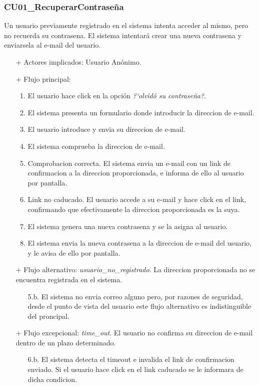 \documentclass[a4paper,11pt]{report}
\begin{document}
    \subsubsection{CU01\_RecuperarContrase\~na}
    Un usuario previamente registrado en el sistema intenta acceder al mismo, pero no recuerda su contrasena. El sistema intentar\'a crear una nueva contrasena y enviarsela al e-mail del usuario.
    \begin{itemize}
        \item[+] Actores implicados: Usuario An\'onimo.
        \item[+] Flujo principal:
        \begin{enumerate}
            \item El usuario hace click en la opci\'on \emph{?`olvid\'o su contrase\~na?}.
            \item El sistema presenta un formulario donde introducir la direccion de e-mail.
            \item El usuario introduce y envia su direccion de e-mail.
            \item El sistema comprueba la direccion de e-mail.
            \item Comprobacion correcta. El sistema envia un e-mail con un link de confirmacion a la direccion proporcionada, e informa de ello al usuario por pantalla.
            \item Link no caducado. El usuario accede a su e-mail y hace click en el link, confirmando que efectivamente la direccion proporcionada es la suya.
            \item El sistema genera una nueva contrasena y se la asigna al usuario.
            \item El sistema envia la nueva contrasena a la direccion de e-mail del usuario, y le avisa de ello por pantalla.
        \end{enumerate}
        \item [+] Flujo alternativo: \emph{usuario\_no\_registrado}. La direccion proporcionada no se encuentra registrada en el sistema.
        \begin{itemize}
            \item [5.b.] El sistema no envia correo alguno pero, por razones de seguridad, desde el punto de vista del usuario este flujo alternativo es indistinguible del proncipal.
        \end{itemize}
        \item[+] Flujo excepcional: \emph{time\_out}. El usuario no confirma su direccion de e-mail dentro de un plazo determinado.
        \begin{itemize}
            \item [6.b.] El sistema detecta el timeout e invalida el link de confirmacion enviado. Si el usuario hace click en el link caducado se le informara de dicha condicion.
        \end{itemize}
    \end{itemize}
\end{document}
